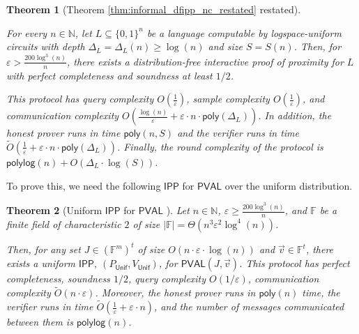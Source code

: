 \documentclass[10pt,a4paper]{article}
\newtheorem{theorem}{Theorem}[section]
\newcommand{\poly}{\mathsf{poly}}
\newcommand{\polylog}{\mathsf{polylog}}
\newcommand{\PVAL}{\mathsf{PVAL}}
\newcommand{\IPP}{\mathsf{IPP}}
\newcommand{\F}{\mathbb{F}}
\newcommand{\N}{\mathbb{N}}
\begin{document}
\begin{theorem}[Theorem \ref{thm:informal_dfipp_nc_restated} restated]
\label{thm:simplerncdfippsizedepth}

For every $n \in \N$, let $L \subseteq \{0,1\}^{n}$ be a language computable by logspace-uniform  circuits with depth $\Delta_{L}=\Delta_{L}(n)\geq \log (n)$ and size $S=S(n)$. Then, for  $\varepsilon > \frac{200\log^{3}(n)}{n}$, there exists a distribution-free interactive proof of proximity for $L$ with perfect completeness and soundness at least $1/2$. 

This protocol has query complexity $O\left( \frac{1}{\varepsilon} \right)$, sample complexity $O\left( \frac{1}{\varepsilon} \right)$, and communication complexity $O\left(\frac{\log(n)}{\varepsilon} +\varepsilon\cdot n\cdot \poly(\Delta_{L})\right)$. In addition, the honest prover runs in time $\poly(n,S)$ and the verifier runs in time $\tilde{O}\left( \frac{1}{\varepsilon}+\varepsilon\cdot n\cdot\poly(\Delta_{L}) \right)$. Finally, the round complexity of the protocol is $\polylog(n)+O(\Delta_{L}\cdot\log (S))$.
\end{theorem}

\noindent To prove this, we need the following $\IPP$ for $\PVAL$ over the uniform distribution.
\begin{theorem}[Uniform $\IPP$ for $\PVAL$ \cite{RR20_batch_polylog}]
\label{thm:uniform_ipp_pval_rvw}
    Let $n\in \N$, $\varepsilon \geq \frac{200\log^{3}(n)}{n}$, and $\F$ be a finite field of characteristic $2$ of size $|\F|=\Theta(n^{3}\varepsilon^{2}\log^{4}(n))$.
    
    Then, for any set $J\in (\F^{m})^{t}$ of size $O(n\cdot \varepsilon\cdot \log (n))$ and $\vec{v}\in \F^{t}$, there exists a uniform $\IPP$, $(P_{\mathsf{Unif}}, V_{\mathsf{Unif}})$, for $\PVAL(J,\vec{v})$. This protocol has perfect completeness, soundness $1/2$, query complexity $O(1/\varepsilon)$, communication complexity $\tilde{O}(n\cdot \varepsilon)$. Moreover, the honest prover runs in $\poly(n)$ time, the verifier runs in time $\tilde{O}\left(\frac{1}{\varepsilon}+\varepsilon\cdot n\right)$, and the number of messages communicated between them is $\polylog(n)$.
\end{theorem}
\end{document}
